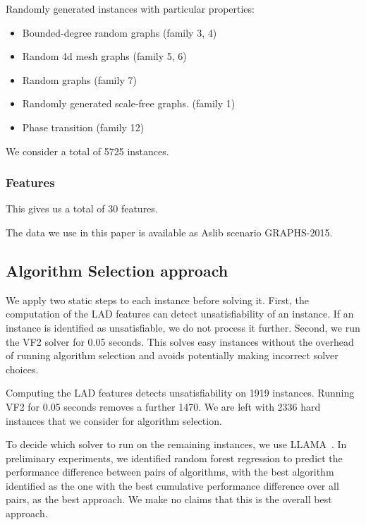 \documentclass{llncs}
\begin{document}
\noindent Randomly generated instances with particular properties:

\begin{itemize}
    \item Bounded-degree random graphs (family 3, 4) \cite{GraphDatabase}
    \item Random 4d mesh graphs (family 5, 6) \cite{GraphDatabase}
    \item Random graphs (family 7) \cite{GraphDatabase}
    \item Randomly generated scale-free graphs. (family 1) \cite{Solnon:2010}
    \item Phase transition (family 12)
\end{itemize}

We consider a total of 5725 instances.

\subsubsection{Features}


This gives us a total of 30 features.

The data we use in this paper is available as Aslib scenario GRAPHS-2015.

\subsection{Algorithm Selection approach}

We apply two static steps to each instance before solving it. First, the
computation of the LAD features can detect unsatisfiability of an instance. If
an instance is identified as unsatisfiable, we do not process it further.
Second, we run the VF2 solver for 0.05 seconds. This solves easy instances
without the overhead of running algorithm selection and avoids potentially
making incorrect solver choices.

Computing the LAD features detects unsatisfiability on 1919 instances. Running
VF2 for 0.05 seconds removes a further 1470. We are left with 2336 hard
instances that we consider for algorithm selection.

To decide which solver to run on the remaining instances, we use
LLAMA~\cite{kotthoff_llama_2013}. In preliminary experiments, we identified
random forest regression to predict the performance difference between pairs of
algorithms, with the best algorithm identified as the one with the best
cumulative performance difference over all pairs, as the best approach. We make
no claims that this is the overall best approach.
\end{document}
